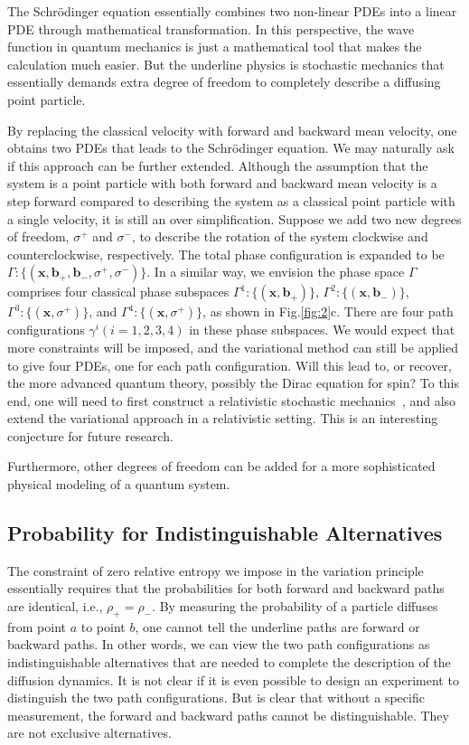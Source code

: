 \documentclass[%
 aip, 
 amsmath,amssymb,amsthm,
 nofootinbib,
 reprint,
]{revtex4-1}
\begin{document}
The Schr\"{o}dinger equation essentially combines two non-linear PDEs into a linear PDE through mathematical transformation. In this perspective, the wave function in quantum mechanics is just a mathematical tool that makes the calculation much easier. But the underline physics is stochastic mechanics that essentially demands extra degree of freedom to completely describe a diffusing point particle.

By replacing the classical velocity with forward and backward mean velocity, one obtains two PDEs that leads to the Schr\"{o}dinger equation. We may naturally ask if this approach can be further extended. Although the assumption that the system is a point particle with both forward and backward mean velocity is a step forward compared to describing the system as a classical point particle with a single velocity, it is still an over simplification. Suppose we add two new degrees of freedom, $\sigma^+$ and $\sigma^-$, to describe the rotation of the system clockwise and counterclockwise, respectively. The total phase configuration is expanded to be $\Gamma: \{(\mathbf{x}, \mathbf{b}_+, \mathbf{b}_-, \sigma^+, \sigma^-)\}$. In a similar way, we envision the phase space $\Gamma$ comprises four classical phase subspaces $\Gamma^1: \{(\mathbf{x}, \mathbf{b}_+)\}$, $\Gamma^2: \{(\mathbf{x}, \mathbf{b}_-)\}$, $\Gamma^3: \{(\mathbf{x}, \sigma^+)\}$, and $\Gamma^4: \{(\mathbf{x}, \sigma^+)\}$, as shown in Fig.\ref{fig:2}c. There are four path configurations $\gamma^i (i=1,2,3,4)$ in these phase subspaces. We would expect that more constraints will be imposed, and the variational method can still be applied to give four PDEs, one for each path configuration. Will this lead to, or recover, the more advanced quantum theory, possibly the Dirac equation for spin? To this end, one will need to first construct a relativistic stochastic mechanics~\cite{Serva, Lindgren, Kuipers}, and also extend the variational approach in a relativistic setting. This is an interesting conjecture for future research.

Furthermore, other degrees of freedom can be added for a more sophisticated physical modeling of a quantum system.

\subsection{Probability for Indistinguishable Alternatives}
The constraint of zero relative entropy we impose in the variation principle essentially requires that the probabilities for both forward and backward paths are identical, i.e., $\rho_+=\rho_-$. By measuring the probability of a particle diffuses from point $a$ to point $b$, one cannot tell the underline paths are forward or backward paths. In other words, we can view the two path configurations as indistinguishable alternatives that are needed to complete the description of the diffusion dynamics. It is not clear if it is even possible to design an experiment to distinguish the two path configurations. But is clear that without a specific measurement, the forward and backward paths cannot be distinguishable. They are not exclusive alternatives.
\end{document}
